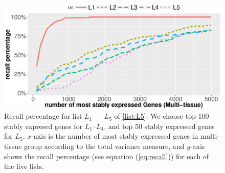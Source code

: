 \documentclass[11pt, a4paper]{article}
\begin{document}

\begin{figure}[h!]
    \begin{center}
	\includegraphics[scale=0.5]{Figures/rankVSrank_RNA2.eps}
	\caption{Recall percentage for list $L_1$ --- $L_5$ of \ref{list:L5}. We choose top 100 stably expresed genes for $L_1$--$L_4$, and top 50 stably expressed genes for $L_5$. $x$-axis is the number of most stably expressed genes in multi-tissue group according to the total variance measure, and $y$-axis shows the recall percentage (see equation (\ref{eq:recall}))  for each of the five lists.}
	\label{fig:rankVSrank_RNA}
    \end{center}
\end{figure}
\end{document}
